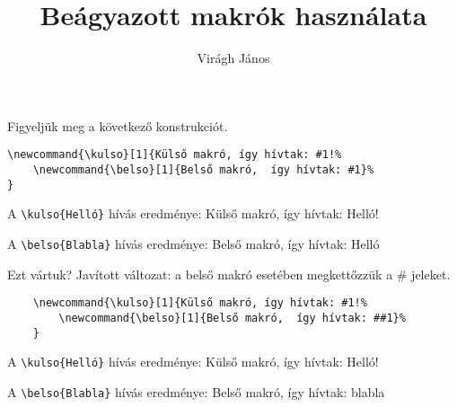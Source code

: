 \documentclass{article}
\title{Beágyazott makrók használata}
\author{Virágh János}
\begin{document}
\maketitle	

Figyeljük meg a következő konstrukciót. 
\begin{verbatim}
\newcommand{\kulso}[1]{Külső makró, így hívtak: #1!%
	\newcommand{\belso}[1]{Belső makró,  így hívtak: #1}%	
}
\end{verbatim}


\newcommand{\kulso}[1]{Külső makró, így hívtak: #1!%
	\newcommand{\belso}[1]{Belső makró,  így hívtak: #1}%
}

A  \verb!\kulso{Helló}! hívás eredménye:
\kulso{Helló}

A \verb!\belso{Blabla}! hívás eredménye:
\belso{blabla}

\vspace*{0.1in}
Ezt vártuk? Javított változat: a belső makró esetében megkettőzzük a \# jeleket.
\begin{verbatim}
	\newcommand{\kulso}[1]{Külső makró, így hívtak: #1!%
		\newcommand{\belso}[1]{Belső makró,  így hívtak: ##1}%	
	}
\end{verbatim}


\renewcommand{\kulso}[1]{Külső makró, így hívtak: #1!%
	\renewcommand{\belso}[1]{Belső makró,  így hívtak: ##1}%
}

A  \verb!\kulso{Helló}! hívás eredménye:
\kulso{Helló}

A \verb!\belso{Blabla}! hívás eredménye:
\belso{blabla}
\end{document}
